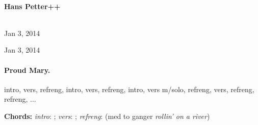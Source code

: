 \documentclass[%
twoside,                 %
draft,                   %
final,                   %
10pt]{article}
\begin{document}
\begin{center}
\ \\ [2mm]


\author{Hans Petter++}

\author{Hans Petter++\inst{}}
\institute{}

\begin{center}
{\bf Hans Petter++${}^{}$} \\ [0mm]
\end{center}

\begin{center}
\end{center}


\date{Jan 3, 2014}
\maketitle
\date{Jan 3, 2014
}

\ \\ [10mm]
{\large\textsf{Jan 3, 2014}}

\end{center}
\vfill
\clearpage

\begin{center}
Jan 3, 2014
\end{center}

\vspace{1cm}



\tableofcontents

\vspace{1cm} %





\paragraph{Proud Mary.}
intro, vers, refreng, intro, vers, refreng, intro, vers m/solo, refreng,
vers, refreng, refreng, ...

\textbf{Chords:} \emph{intro}: ;
\emph{vers}: ; \emph{refreng}:  (med to ganger \emph{rollin' on a river})
\end{document}
